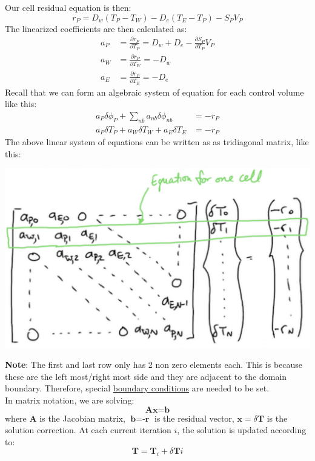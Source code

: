 \documentclass[14pt]{article}
\begin{document}
Our cell residual equation is then:
\begin{equation}
r_P = D_w (T_P-T_W)-D_e(T_E-T_P)-S_PV_P
\end{equation}
The linearized coefficients are then calculated as:
\begin{align}
a_P &= \frac{\partial r_P}{\partial T_P} = D_w + D_e - \frac{\partial S_P}{\partial T_P}V_P\\
a_W &= \frac{\partial r_P}{\partial T_W} = -D_w\\
a_E &= \frac{\partial r_P}{\partial T_E} = -D_e
\end{align}
Recall that we can form an algebraic system of equation for each control volume like this:
\begin{align}
a_P\delta \phi_P + \sum_{nb} a_{nb}\delta \phi_{nb} &= -r_P\\
a_P\delta T_P + a_W\delta T_W + a_E \delta T_E &= -r_P 
\end{align}
The above linear system of equations can be written as as tridiagonal matrix, like this:
\begin{center}
\includegraphics[scale=0.2]{pic/heat1D_tridiagonal.png}
\end{center}
\textbf{Note}: The first and last row only has 2 non zero elements each. This is because these are the left most/right most side and they are
adjacent to the domain boundary. Therefore, special \uline{boundary conditions} are needed to be set. \\
In matrix notation, we are solving:
\begin{equation}
\textbf{A}\textbf{x} = \textbf{b}  
\end{equation}
where \(\textbf{A}\) is the Jacobian matrix, \(\textbf{b} = \textbf{-r}\) is the residual vector, \(\textbf{x} = \delta \textbf{T}\)
is the solution correction. At each current iteration \(i\), the solution is updated according to:
\begin{equation}
\textbf{T} = \textbf{T}_i + \delta \textbf{T}i
\end{equation}
\end{document}
